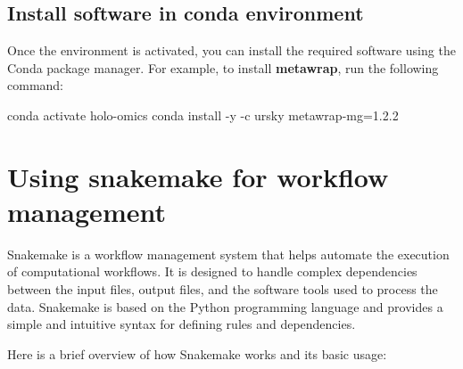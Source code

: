 \documentclass[
]{book}
\newenvironment{Shaded}{\begin{snugshade}}{\end{snugshade}}
\newcommand{\AttributeTok}[1]{\textcolor[rgb]{0.77,0.63,0.00}{#1}}
\newcommand{\ExtensionTok}[1]{#1}
\newcommand{\NormalTok}[1]{#1}
\begin{document}
\normalsize

\hypertarget{install-software-in-conda-environment}{%
\subsection*{Install software in conda environment}\label{install-software-in-conda-environment}}

Once the environment is activated, you can install the required software using the Conda package manager. For example, to install \textbf{metawrap}, run the following command:

\small

\begin{Shaded}
\begin{Highlighting}[]
\ExtensionTok{conda}\NormalTok{ activate holo{-}omics}
\ExtensionTok{conda}\NormalTok{ install }\AttributeTok{{-}y} \AttributeTok{{-}c}\NormalTok{ ursky metawrap{-}mg=1.2.2}
\end{Highlighting}
\end{Shaded}

\normalsize

\hypertarget{using-snakemake}{%
\section{Using snakemake for workflow management}\label{using-snakemake}}

Snakemake is a workflow management system that helps automate the execution of computational workflows. It is designed to handle complex dependencies between the input files, output files, and the software tools used to process the data. Snakemake is based on the Python programming language and provides a simple and intuitive syntax for defining rules and dependencies.

Here is a brief overview of how Snakemake works and its basic usage:
\end{document}
